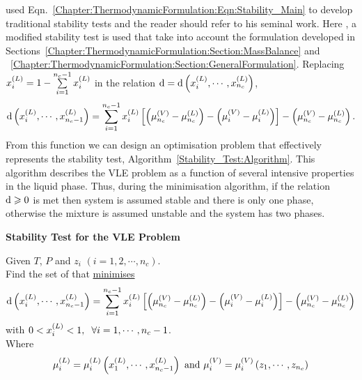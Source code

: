 \citet{michelsen_1984} used Eqn.~\ref{Chapter:ThermodynamicFormulation:Eqn:Stability_Main} to develop traditional stability tests and the reader should refer to his seminal work. Here \citep[see][]{Henderson_Thesis}, a modified stability test is used that take into account the formulation developed in Sections~\ref{Chapter:ThermodynamicFormulation:Section:MassBalance} and ~\ref{Chapter:ThermodynamicFormulation:Section:GeneralFormulation}.  Replacing $\mfr[x]{i}{L} = 1 - \summation_{i=1}^{n_{c}-1}\mfr[x]{i}{L}$ in the relation $\d=\d\left(\mfr[x]{i}{L}, \cdots, \mfr[x]{n_{c}}{L}\right)$,
\begin{equation}
   \d\left(\mfr[x]{i}{L}, \cdots, \mfr[x]{n_{c}-1}{L}\right) = \summation_{i=1}^{n_{c}-1}\mfr[x]{i}{L}\left[\left(\mfr[\mu]{n_{c}}{V}-\mfr[\mu]{n_{c}}{L}\right)-\left(\mfr[\mu]{i}{V}-\mfr[\mu]{i}{L}\right)\right] - \left(\mfr[\mu]{n_{c}}{V}-\mfr[\mu]{n_{c}}{L}\right).
\end{equation}
From this function we can design an optimisation problem that effectively represents the stability test, Algorithm~\ref{Stability_Test:Algorithm}. This algorithm describes the VLE problem as a function of several intensive properties in the liquid phase.  Thus, during the minimisation algorithm, if the relation $\d\ge 0$ is met then system is assumed stable and there is only one phase, otherwise the mixture is assumed unstable and the system has two phases. 
\begin{algorithm}[h]
\begin{shaded}
   \begin{center}
     {\bf Stability Test for the VLE Problem}
   \end{center}

   Given $T$, $P$ and $z_{i}$ $\left(i=1,2,\cdots,n_{c}\right)$. \\
   Find the set of  that \underline{minimises}
   \begin{displaymath}
        \d\left(\mfr[x]{i}{L}, \cdots, \mfr[x]{n_{c}-1}{L}\right) = \summation_{i=1}^{n_{c}-1}\mfr[x]{i}{L}\left[\left(\mfr[\mu]{n_{c}}{V}-\mfr[\mu]{n_{c}}{L}\right)-\left(\mfr[\mu]{i}{V}-\mfr[\mu]{i}{L}\right)\right] - \left(\mfr[\mu]{n_{c}}{V}-\mfr[\mu]{n_{c}}{L}\right)
   \end{displaymath} 
   with $0<\mfr[x]{i}{L}<1,\hspace{.2cm} \forall i=1,\cdots,n_{c}-1$. \\
   Where
   \begin{displaymath}
      \mfr[\mu]{i}{L} = \mfr[\mu]{i}{L} \left(\mfr[x]{1}{L},\cdots,\mfr[x]{n_{c}-1}{L}\right)\text{ and } \mfr[\mu]{i}{V} = \mfr[\mu]{i}{V} \left(z_{1},\cdots, z_{n_{c}}\right)
   \end{displaymath}
\end{shaded}
\label{Stability_Test:Algorithm}\caption{Modified stability test for the VLE problem.}
\end{algorithm}

